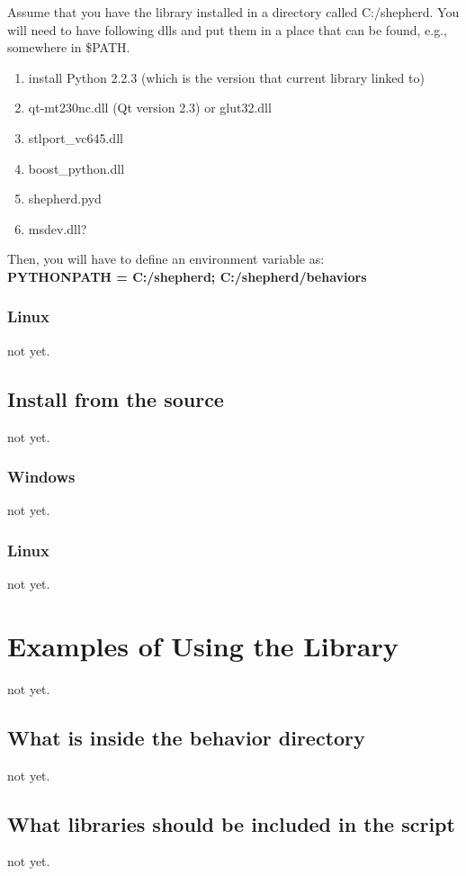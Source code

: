 \documentclass[onecolumn,10pt]{article}
\begin{document}
Assume that you have the library installed in a directory called C:/shepherd.
You will need to have following dlls and put them in a place that can be 
found, e.g., somewhere in \$PATH.

\begin{enumerate}
\item install Python 2.2.3 (which is the version that current library linked to)
\item qt-mt230nc.dll (Qt version 2.3) or glut32.dll
\item stlport\_vc645.dll
\item boost\_python.dll
\item shepherd.pyd
\item msdev.dll?
\end{enumerate}

Then, you will have to define an environment variable as:\\
{\bf PYTHONPATH = C:/shepherd; C:/shepherd/behaviors}

\subsubsection{Linux}
not yet.

\subsection{Install from the source}
not yet.

\subsubsection{Windows}
not yet.

\subsubsection{Linux}
not yet.

\section{Examples of Using the Library}
not yet.

\subsection{What is inside the behavior directory}
not yet.

\subsection{What libraries should be included in the script}
not yet.
\end{document}
